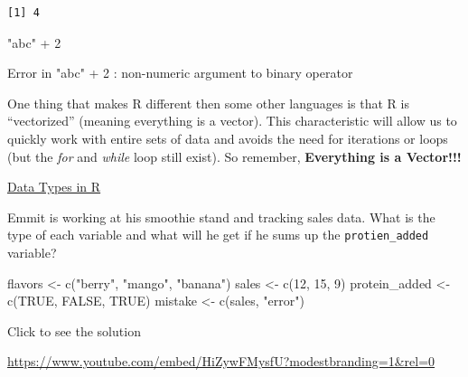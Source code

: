 \documentclass[
  letterpaper,
  DIV=11,
  numbers=noendperiod]{scrreprt}
\newenvironment{Shaded}{\begin{snugshade}}{\end{snugshade}}
\newcommand{\ConstantTok}[1]{\textcolor[rgb]{0.56,0.35,0.01}{#1}}
\newcommand{\DecValTok}[1]{\textcolor[rgb]{0.68,0.00,0.00}{#1}}
\newcommand{\FunctionTok}[1]{\textcolor[rgb]{0.28,0.35,0.67}{#1}}
\newcommand{\NormalTok}[1]{\textcolor[rgb]{0.00,0.23,0.31}{#1}}
\newcommand{\OtherTok}[1]{\textcolor[rgb]{0.00,0.23,0.31}{#1}}
\newcommand{\SpecialCharTok}[1]{\textcolor[rgb]{0.37,0.37,0.37}{#1}}
\newcommand{\StringTok}[1]{\textcolor[rgb]{0.13,0.47,0.30}{#1}}
\begin{document}
\begin{verbatim}
[1] 4
\end{verbatim}

\begin{Shaded}
\begin{Highlighting}[]
\StringTok{"abc"} \SpecialCharTok{+} \DecValTok{2}
\end{Highlighting}
\end{Shaded}

{Error in "abc" + 2 : non-numeric argument to binary operator}

One thing that makes R different then some other languages is that R is
``vectorized'' (meaning everything is a vector). This characteristic
will allow us to quickly work with entire sets of data and avoids the
need for iterations or loops (but the \emph{for} and \emph{while} loop
still exist). So remember, \textbf{Everything is a Vector!!!}

\begin{watch}{}{}
    \href{https://youtu.be/6m-hh-NG0X0}{Data Types in R}
\end{watch}

\begin{tcolorbox}[enhanced jigsaw, colframe=quarto-callout-tip-color-frame, colback=white, breakable, rightrule=.15mm, title=\textcolor{quarto-callout-tip-color}{\faLightbulb}\hspace{0.5em}{Try it Out}, bottomtitle=1mm, toptitle=1mm, titlerule=0mm, left=2mm, coltitle=black, colbacktitle=quarto-callout-tip-color!10!white, leftrule=.75mm, opacitybacktitle=0.6, bottomrule=.15mm, opacityback=0, arc=.35mm, toprule=.15mm]

Emmit is working at his smoothie stand and tracking sales data. What is
the type of each variable and what will he get if he sums up the
\texttt{protien\_added} variable?

\begin{Shaded}
\begin{Highlighting}[]
\NormalTok{flavors }\OtherTok{\textless{}{-}} \FunctionTok{c}\NormalTok{(}\StringTok{"berry"}\NormalTok{, }\StringTok{"mango"}\NormalTok{, }\StringTok{"banana"}\NormalTok{)}
\NormalTok{sales }\OtherTok{\textless{}{-}} \FunctionTok{c}\NormalTok{(}\DecValTok{12}\NormalTok{, }\DecValTok{15}\NormalTok{, }\DecValTok{9}\NormalTok{)}
\NormalTok{protein\_added }\OtherTok{\textless{}{-}} \FunctionTok{c}\NormalTok{(}\ConstantTok{TRUE}\NormalTok{, }\ConstantTok{FALSE}\NormalTok{, }\ConstantTok{TRUE}\NormalTok{)}
\NormalTok{mistake }\OtherTok{\textless{}{-}} \FunctionTok{c}\NormalTok{(sales, }\StringTok{"error"}\NormalTok{)}
\end{Highlighting}
\end{Shaded}

Click to see the solution

\url{https://www.youtube.com/embed/HiZywFMysfU?modestbranding=1&rel=0}

\end{tcolorbox}
\end{document}
